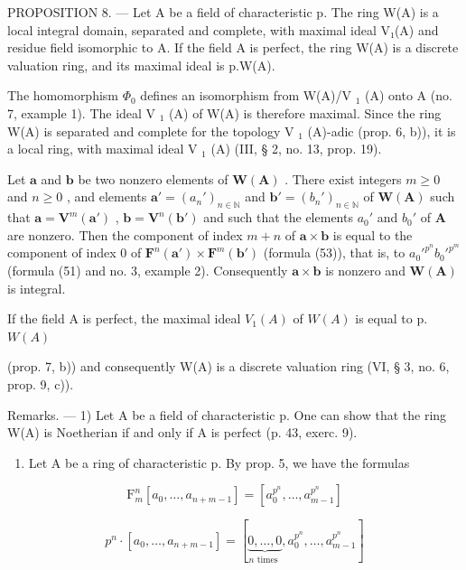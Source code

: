 PROPOSITION 8. — Let A be a field of characteristic p. The ring W(A) is a local integral domain, separated and complete, with maximal ideal V₁(A) and residue field isomorphic to A. If the field A is perfect, the ring W(A) is a discrete valuation ring, and its maximal ideal is p.W(A).

The homomorphism \(\Phi_{0}\) defines an isomorphism from W(A)/V \(_{1}\) (A) onto A (no. 7, example 1). The ideal V \(_{1}\) (A) of W(A) is therefore maximal. Since the ring W(A) is separated and complete for the topology V \(_{1}\) (A)-adic (prop. 6, b)), it is a local ring, with maximal ideal V \(_{1}\) (A) (III, § 2, no. 13, prop. 19).

Let \(\pmb{a}\) and \(\pmb{b}\) be two nonzero elements of \(\mathbf{W}(\mathbf{A})\) . There exist integers \(m \geqslant 0\) and \(n \geqslant 0\) , and elements \(\pmb{a}' = (a_n')_{n \in \mathbb{N}}\) and \(\pmb{b}' = (b_n')_{n \in \mathbb{N}}\) of \(\mathbf{W}(\mathbf{A})\) such that \(\pmb{a} = \mathbf{V}^m(\pmb{a}')\) , \(\pmb{b} = \mathbf{V}^n(\pmb{b}')\) and such that the elements \(a_0'\) and \(b_0'\) of \(\mathbf{A}\) are nonzero. Then the component of index \(m + n\) of \(\pmb{a} \times \pmb{b}\) is equal to the component of index 0 of \(\mathbf{F}^n(\pmb{a}') \times \mathbf{F}^m(\pmb{b}')\) (formula (53)), that is, to \(a_0'^{p^n} b_0'^{p^m}\) (formula (51) and no. 3, example 2). Consequently \(\pmb{a} \times \pmb{b}\) is nonzero and \(\mathbf{W}(\mathbf{A})\) is integral.

If the field A is perfect, the maximal ideal \(V_{1}(A)\) of \(W(A)\) is equal to p.\(W(A)\)

(prop. 7, b)) and consequently W(A) is a discrete valuation ring (VI, § 3, no. 6, prop. 9, c)).

Remarks. --- 1) Let A be a field of characteristic p. One can show that the ring W(A) is Noetherian if and only if A is perfect (p. 43, exerc. 9).

\begin{enumerate}
\def\labelenumi{\arabic{enumi})}
\setcounter{enumi}{1}
\tightlist
\item
  Let A be a ring of characteristic p. By prop. 5, we have the formulas
\end{enumerate}

\[
\mathrm{F} _ {m} ^ {n} [ a _ {0}, \dots , a _ {n + m - 1} ] = [ a _ {0} ^ {p ^ {n}}, \dots , a _ {m - 1} ^ {p ^ {n}} ]
\]

\[
p ^ {n} \cdot [ a _ {0}, \dots , a _ {n + m - 1} ] = [ \underbrace {0 , \dots , 0} _ {n \text {   times }}, a _ {0} ^ {p ^ {n}}, \dots , a _ {m - 1} ^ {p ^ {n}} ]
\]

